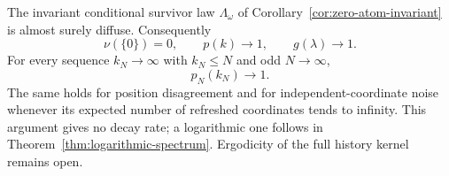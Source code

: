 \documentclass[11pt,letterpaper]{article}
\begin{document}
\begin{theorem}
\label{thm:no-zero-atom}
The invariant conditional survivor law $\Lambda_\omega$ of
Corollary~\ref{cor:zero-atom-invariant} is almost surely diffuse.
Consequently
\begin{equation}\label{eq:no-zero-atom}
 \nu(\{0\})=0,\qquad p(k)\longrightarrow1,\qquad
 g(\lambda)\longrightarrow1.
\end{equation}
For every sequence $k_N\to\infty$ with $k_N\le N$ and odd $N\to\infty$,
\begin{equation}\label{eq:growing-noise-decorrelation}
 p_N(k_N)\longrightarrow1.
\end{equation}
The same holds for position disagreement and for independent-coordinate
noise whenever its expected number of refreshed coordinates tends to
infinity. This argument gives no decay rate; a logarithmic one follows
in Theorem~\ref{thm:logarithmic-spectrum}. Ergodicity of the full
history kernel remains open.
\end{theorem}
\end{document}
